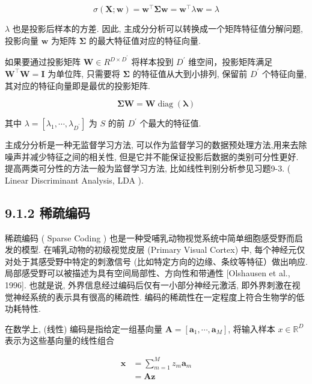 \documentclass[10pt]{article}
\begin{document}
\begin{equation*}
\sigma(\boldsymbol{X} ; \boldsymbol{w})=\boldsymbol{w}^{\top} \boldsymbol{\Sigma} \boldsymbol{w}=\boldsymbol{w}^{\top} \lambda \boldsymbol{w}=\lambda \tag{9.7}
\end{equation*}


$\lambda$ 也是投影后样本的方差. 因此, 主成分分析可以转换成一个矩阵特征值分解问题,投影向量 $\boldsymbol{w}$ 为矩阵 $\boldsymbol{\Sigma}$ 的最大特征值对应的特征向量.

如果要通过投影矩阵 $\boldsymbol{W} \in R^{D \times D^{\prime}}$ 将样本投到 $D^{\prime}$ 维空间，投影矩阵满足 $\boldsymbol{W}^{\top} \boldsymbol{W}=\boldsymbol{I}$ 为单位阵, 只需要将 $\boldsymbol{\Sigma}$ 的特征值从大到小排列, 保留前 $D^{\prime}$ 个特征向量,其对应的特征向量即是最优的投影矩阵.


\begin{equation*}
\boldsymbol{\Sigma} \boldsymbol{W}=\boldsymbol{W} \operatorname{diag}(\boldsymbol{\lambda}) \tag{9.8}
\end{equation*}


其中 $\lambda=\left[\lambda_{1}, \cdots, \lambda_{D^{\prime}}\right]$ 为 $S$ 的前 $D^{\prime}$ 个最大的特征值.

主成分分析是一种无监督学习方法, 可以作为监督学习的数据预处理方法,用来去除噪声并减少特征之间的相关性, 但是它并不能保证投影后数据的类别可分性更好. 提高两类可分性的方法一般为监督学习方法, 比如线性判别分析参见习题9-3. ( Linear Discriminant Analysis, LDA ).

\subsection*{9.1.2 稀疏编码}
稀疏编码 ( Sparse Coding ) 也是一种受哺乳动物视觉系统中简单细胞感受野而启发的模型. 在哺乳动物的初级视觉皮层 (Primary Visual Cortex) 中, 每个神经元仅对处于其感受野中特定的刺激信号 (比如特定方向的边缘、条纹等特征）做出响应. 局部感受野可以被描述为具有空间局部性、方向性和带通性 [Olshausen et al., 1996]. 也就是说, 外界信息经过编码后仅有一小部分神经元激活, 即外界刺激在视觉神经系统的表示具有很高的稀疏性. 编码的稀疏性在一定程度上符合生物学的低功耗特性.

在数学上, (线性) 编码是指给定一组基向量 $\boldsymbol{A}=\left[\boldsymbol{a}_{1}, \cdots, \boldsymbol{a}_{M}\right]$, 将输入样本 $x \in \mathbb{R}^{D}$ 表示为这些基向量的线性组合


\begin{align*}
\boldsymbol{x} & =\sum_{m=1}^{M} z_{m} \boldsymbol{a}_{m}  \tag{9.9}\\
& =\boldsymbol{A z} \tag{9.10}
\end{align*}
\end{document}
